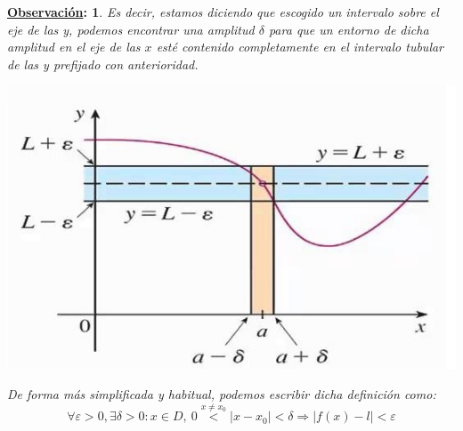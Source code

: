 \documentclass[10pt,a4paper,openright]{book}
\theoremstyle{break}
\newtheorem*{obs}{\underline{Observación}:}
\begin{document}
\begin{obs}
Es decir, estamos diciendo que escogido un intervalo sobre el eje de las y, podemos encontrar una amplitud $\delta$ para que un entorno de dicha amplitud en el eje de las $x$ esté contenido completamente en el intervalo tubular de las y prefijado con anterioridad.

\begin{center}
\includegraphics[scale=0.40]{limite}
\end{center}

De forma más simplificada y habitual, podemos escribir dicha definición como:
$$\forall \varepsilon>0, \exists \delta>0 : x\in D, \ 0\stackrel{x\neq x_0}{<}|x-x_0|<\delta\Rightarrow |f(x)-l|<\varepsilon$$
\end{obs}
\end{document}
